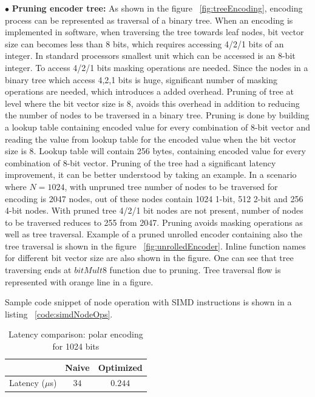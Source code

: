 $\bullet$ \textbf{Pruning encoder tree:} As shown in the figure ~\ref{fig:treeEncoding}, encoding process can be represented as traversal of a binary tree. When an encoding is implemented in software, when traversing the tree towards leaf nodes, bit vector size can becomes less than 8 bits, which requires accessing 4/2/1 bits of an integer. In standard processors smallest unit which can be accessed is an 8-bit integer. To access 4/2/1 bits masking operations are needed. Since the nodes in a binary tree which access 4,2,1 bits is huge, significant number of masking operations are needed, which introduces a added overhead. Pruning of tree at level where the bit vector size is 8, avoids this overhead in addition to reducing the number of nodes to be traversed in a binary tree. Pruning is done by building a lookup table containing encoded value for every combination of 8-bit vector and reading the value from lookup table for the encoded value when the bit vector size is 8. Lookup table will contain 256 bytes, containing encoded value for every combination of 8-bit vector.\newline
\newline
Pruning of the tree had a significant latency improvement, it can be better understood by taking an example. In a scenario where $N = 1024$, with unpruned tree number of nodes to be traversed for encoding is 2047 nodes, out of these nodes contain 1024 1-bit, 512 2-bit and 256 4-bit nodes. With pruned tree 4/2/1 bit nodes are not present, number of nodes to be traversed reduces to 255 from 2047. Pruning avoids masking operations as well as tree traversal. \newline
\newline
Example of a pruned unrolled encoder containing also the tree traversal is shown in the figure ~\ref{fig:unrolledEncoder}. Inline function names for different bit vector size are also shown in the figure. One can see that tree traversing ends at $bitMult8$ function due to pruning. Tree traversal flow is represented with orange line in a figure.

Sample code snippet of node operation with SIMD instructions is shown in a listing ~\ref{code:simdNodeOps}.

\begin{table}[]
	\begin{center}
		\caption{Latency comparison: polar encoding for 1024 bits}
		\label{tab:polarEncoder}
		\begin{tabular}{c|c|c} %
			\textbf{ } & Naive & Optimized \\
			\hline
			Latency ($\mu$s) & $34$ & $0.244$\\
		\end{tabular}
	\end{center}
\end{table}

